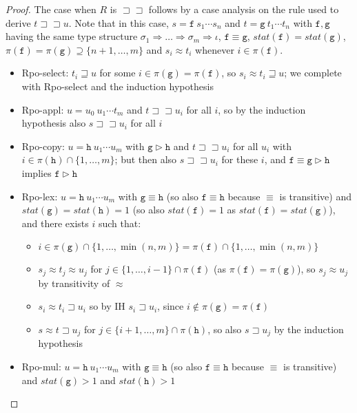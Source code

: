 \documentclass[a4paper,USenglish,cleveref,autoref,thm-restate]{lipics-v2021}
\newcommand{\arrtype}{\Rightarrow}
\newcommand{\grmain}{\sqsupset}
\newcommand{\geqmain}{\sqsupseteq}
\newcommand{\ismain}{\approx}
\newcommand{\rpomain}{\sqsupset\!\!\sqsupset}
\newcommand{\grpred}{\rhd}
\newcommand{\eqpred}{\equiv}
\newcommand{\symb}[1]{\mathtt{#1}}
\newcommand{\afun}{\symb{f}}
\newcommand{\bfun}{\symb{g}}
\newcommand{\cfun}{\symb{h}}
\newcommand{\atype}{\sigma}
\newcommand{\asort}{\iota}
\newcommand{\status}{\mathit{stat}}
\newcommand{\filter}{\pi}
\begin{document}
\begin{proof}
The case when $R$ is $\rpomain$ follows by a case analysis on the rule used to derive $t \rpomain u$.
Note that in this case, $s = \afun\ s_1 \cdots s_n$ and $t = \bfun\ t_1 \cdots t_n$ with
$\afun,\bfun$ having the same type structure $\atype_1 \arrtype \dots \arrtype \atype_m
\arrtype \asort$, $\afun \eqpred \bfun$, $\status(\afun) = \status(\bfun)$, $\filter(\afun) =
\filter(\bfun) \supseteq \{n+1,\dots,m\}$ and $s_i \ismain t_i$ whenever $i \in \pi(\afun)$.
\begin{itemize}
\item Rpo-select: $t_i \geqmain u$ for some $i \in \pi(\bfun) = \pi(\afun)$, so
  $s_i \ismain t_i \geqmain u$; we complete with Rpo-select and the induction hypothesis
\item Rpo-appl: $u = u_0\ u_1 \cdots t_m$ and $t \rpomain u_i$ for all $i$, so by the induction
  hypothesis also $s \rpomain u_i$ for all $i$
\item Rpo-copy: $u = \cfun\ u_1 \cdots u_m$ with $\bfun \grpred \cfun$ and $t \rpomain u_i$ for all
  $u_i$ with $i \in \filter(\cfun) \cap \{1,\dots,m\}$; but then also $s \rpomain u_i$ for these
  $i$, and $\afun \eqpred \bfun \grpred \cfun$ implies $\afun \grpred \cfun$
\item Rpo-lex: $u = \cfun\ u_1 \cdots u_m$ with $\bfun \eqpred \cfun$ (so also $\afun \eqpred
  \cfun$ because $\eqpred$ is transitive) and $\status(\bfun) = \status(\cfun) = 1$ (so also
  $\status(\afun) = 1$ as $\status(\afun) = \status(\bfun)$), and there exists $i$ such that:
  \begin{itemize}
  \item $i \in \filter(\bfun) \cap \{1,\dots,\min(n,m)\} = \filter(\afun) \cap \{1,\dots,\min(n,m)\}$
  \item $s_j \ismain t_j \ismain u_j$ for $j \in \{1,\dots,i-1\} \cap \filter(\afun)$ (as
    $\filter(\afun) = \filter(\bfun)$), so $s_j \ismain u_j$ by transitivity of $\ismain$
  \item $s_i \ismain t_i \grmain u_i$ so by IH $s_i \grmain u_i$,
    since $i \notin \filter(\bfun) = \filter(\afun)$
  \item $s \ismain t \grmain u_j$ for $j \in \{i+1,\dots,m\} \cap \filter(\cfun)$, so also
    $s \grmain u_j$ by the induction hypothesis
    \qedhere
  \end{itemize}
\item Rpo-mul: $u = \cfun\ u_1 \cdots u_m$ with $\bfun \eqpred \cfun$ (so also $\afun \eqpred
  \cfun$ because $\eqpred$ is transitive) and $\status(\bfun) > 1$ and $\status(\cfun) > 1$

\end{itemize}
\end{proof}
\end{document}
